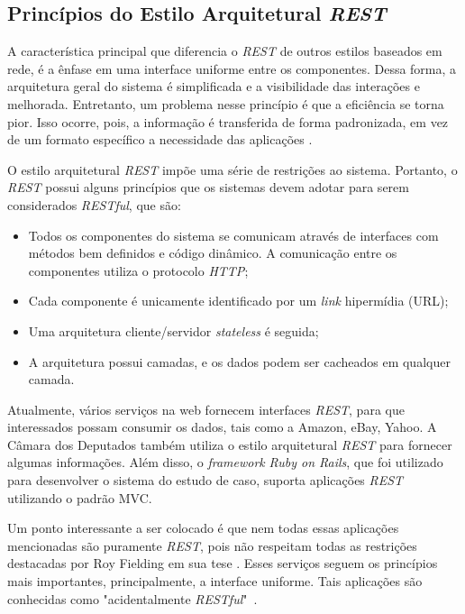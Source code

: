 \subsection{Princípios do Estilo Arquitetural \textit{REST}}

	A característica principal que diferencia o \textit{REST} de outros estilos baseados em rede, é a ênfase em uma interface uniforme entre os componentes. Dessa forma, a arquitetura geral do sistema é simplificada e a visibilidade das interações e melhorada. Entretanto, um problema nesse princípio é que a eficiência se torna pior. Isso ocorre, pois, a informação é transferida de forma padronizada, em vez de um formato específico a necessidade das aplicações \cite{fielding2000architectural}.
	
	O estilo arquitetural \textit{REST} impõe uma série de restrições ao sistema. Portanto, o \textit{REST} possui alguns princípios que os sistemas devem adotar para serem considerados \textit{RESTful}, que são: 

\begin{itemize}
	\item Todos os componentes do sistema se comunicam através de interfaces com métodos bem definidos e código dinâmico. A comunicação entre os componentes utiliza o protocolo \textit{HTTP};
	\item Cada componente é unicamente identificado por um \textit{link} hipermídia (URL);
	\item Uma arquitetura cliente/servidor \textit{stateless} é seguida;
	\item A arquitetura possui camadas, e os dados podem ser cacheados em qualquer camada.
\end{itemize}

	Atualmente, vários serviços na web fornecem interfaces \textit{REST}, para que interessados possam consumir os dados, tais como a Amazon, eBay, Yahoo. A Câmara dos Deputados também utiliza o estilo arquitetural \textit{REST} para fornecer algumas informações. Além disso, o \textit{framework} \textit{Ruby on Rails}, que foi utilizado para desenvolver o sistema do estudo de caso, suporta aplicações \textit{REST} utilizando o padrão MVC.
	
	Um ponto interessante a ser colocado é que nem todas essas aplicações mencionadas são puramente \textit{REST}, pois não respeitam todas as restrições destacadas por Roy Fielding em sua tese \cite{fielding2000architectural}. Esses serviços seguem os princípios mais importantes, principalmente, a interface uniforme. Tais aplicações são conhecidas como "acidentalmente \textit{RESTful}"\ \cite{acident-rest}.

